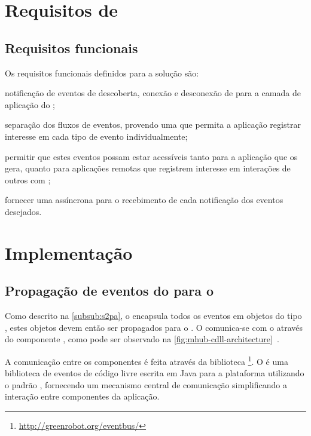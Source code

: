\section{Requisitos de \software}

\subsection*{Requisitos funcionais}

Os requisitos funcionais definidos para a solução são:

\begin{alineas}
	\item notificação de eventos de descoberta, conexão e desconexão de \smartobjs para a camada de aplicação do \software;

	\item separação dos fluxos de eventos, provendo uma \api que permita a aplicação registrar interesse em cada tipo de evento individualmente;

	\item permitir que estes eventos possam estar acessíveis tanto para a aplicação que os gera, quanto para aplicações remotas que registrem interesse em interações de outros \smartphones com \smartobjs;

	\item fornecer uma \api assíncrona para o recebimento de cada notificação dos eventos desejados.
\end{alineas}

\section{Implementação}

\subsection{Propagação de eventos do \stwopa para o \cddl}

Como descrito na \autoref{subsub:s2pa}, o \mhub encapsula todos os eventos em objetos do tipo \sensordata, estes objetos devem então ser propagados para o \cddl.
O \stwopa comunica-se com o \cddl através do componente \qocevaluator, como pode ser observado na \autoref{fig:mhub-cdll-architecture}~\cite{gomes:2017}.

A comunicação entre os componentes é feita através da biblioteca \eventbus\footnote{\url{http://greenrobot.org/eventbus/}}.
O \eventbus é uma biblioteca de eventos de código livre escrita em Java para a plataforma \android utilizando o padrão \pubsub, fornecendo um mecanismo central de comunicação simplificando a interação entre componentes da aplicação.

